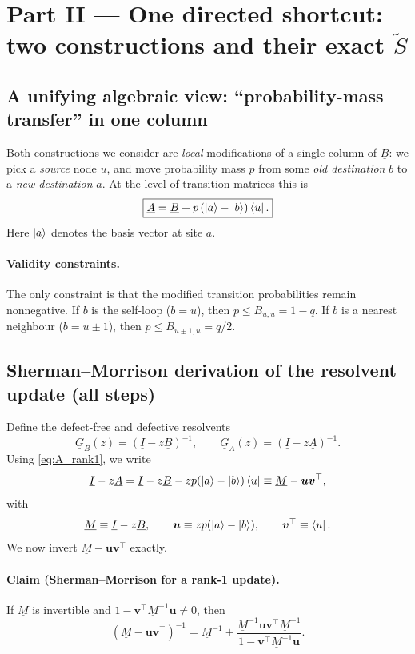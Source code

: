 \documentclass[11pt]{article}
\begin{document}
\section{Part II --- One directed shortcut: two constructions and their exact $\tilde S$}

\subsection{A unifying algebraic view: ``probability-mass transfer'' in one column}

Both constructions we consider are \emph{local} modifications of a single column of $\underline{B}$:
we pick a \emph{source} node $u$, and move probability mass $p$ from some \emph{old destination} $b$ to a \emph{new destination} $a$.
At the level of transition matrices this is
\begin{equation}
\boxed{
\underline{A}=\underline{B}+p\,(\ket{a}-\ket{b})\bra{u}.
}
\label{eq:A_rank1}
\end{equation}
Here $\ket{a}$ denotes the basis vector at site $a$.

\paragraph{Validity constraints.}
The only constraint is that the modified transition probabilities remain nonnegative.
If $b$ is the self-loop ($b=u$), then $p\le B_{u,u}=1-q$.
If $b$ is a nearest neighbour ($b=u\pm1$), then $p\le B_{u\pm1,u}=q/2$.

\subsection{Sherman--Morrison derivation of the resolvent update (all steps)}

Define the defect-free and defective resolvents
\[
\underline{G}_B(z)=(\underline{I}-z\underline{B})^{-1},\qquad \underline{G}_A(z)=(\underline{I}-z\underline{A})^{-1}.
\]
Using \eqref{eq:A_rank1}, we write
\[
\underline{I}-z\underline{A}=\underline{I}-z\underline{B}-z p(\ket a-\ket b)\bra u
\equiv \underline{M}-\bm{u}\bm{v}^\top,
\]
with
\[
\underline{M}\equiv \underline{I}-z\underline{B},
\qquad
\bm{u}\equiv z p(\ket a-\ket b),
\qquad
\bm{v}^\top \equiv \bra u.
\]
We now invert $\underline{M}-\bm{u}\bm{v}^\top$ exactly.

\paragraph{Claim (Sherman--Morrison for a rank-1 update).}
If $\underline{M}$ is invertible and $1-\bm{v}^\top \underline{M}^{-1}\bm{u}\neq 0$, then
\begin{equation}
(\underline{M}-\bm{u}\bm{v}^\top)^{-1}
=
\underline{M}^{-1}
+
\frac{\underline{M}^{-1}\bm{u}\bm{v}^\top \underline{M}^{-1}}{1-\bm{v}^\top \underline{M}^{-1}\bm{u}}.
\label{eq:SM}
\end{equation}
\end{document}

